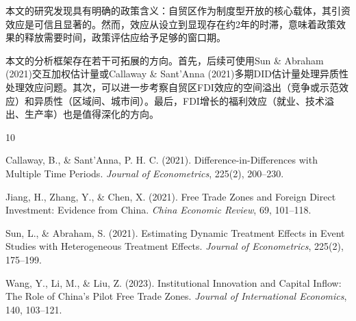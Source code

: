 \documentclass[12pt,a4paper]{article}
\begin{document}
本文的研究发现具有明确的政策含义：自贸区作为制度型开放的核心载体，其引资效应是可信且显著的。然而，效应从设立到显现存在约2年的时滞，意味着政策效果的释放需要时间，政策评估应给予足够的窗口期。

本文的分析框架存在若干可拓展的方向。首先，后续可使用Sun \& Abraham (2021)交互加权估计量或Callaway \& Sant'Anna (2021)多期DID估计量处理异质性处理效应问题。其次，可以进一步考察自贸区FDI效应的空间溢出（竞争或示范效应）和异质性（区域间、城市间）。最后，FDI增长的福利效应（就业、技术溢出、生产率）也是值得深化的方向。

\begin{thebibliography}{10}

Callaway, B., \& Sant'Anna, P. H. C. (2021).
\newblock Difference-in-Differences with Multiple Time Periods.
\newblock \textit{Journal of Econometrics}, 225(2), 200--230.

Jiang, H., Zhang, Y., \& Chen, X. (2021).
\newblock Free Trade Zones and Foreign Direct Investment: Evidence from China.
\newblock \textit{China Economic Review}, 69, 101--118.

Sun, L., \& Abraham, S. (2021).
\newblock Estimating Dynamic Treatment Effects in Event Studies with Heterogeneous Treatment Effects.
\newblock \textit{Journal of Econometrics}, 225(2), 175--199.

Wang, Y., Li, M., \& Liu, Z. (2023).
\newblock Institutional Innovation and Capital Inflow: The Role of China's Pilot Free Trade Zones.
\newblock \textit{Journal of International Economics}, 140, 103--121.

\end{thebibliography}
\end{document}
